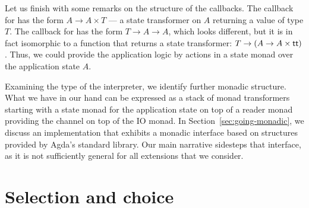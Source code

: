 \documentclass[acmsmall,review,anonymous,screen]{acmart}
\begin{document}
Let us finish with some remarks on the structure of the callbacks. The
callback for {\ACSEND} has the form $A \to A \times T$ --- a state
transformer on $A$ returning a value of type $T$. The callback for
{\ACRECV} has the form $T \to A \to A$, which looks different, but it
is in fact isomorphic to a function that returns a state transformer:
$T \to (A \to A \times \Att)$. Thus, we could provide the
application logic by actions in a state monad over the application
state $A$.

Examining the type of the interpreter, we identify further monadic
structure. What we have in our hand can be expressed as a stack of monad transformers starting with a state
monad for the application state on top of a reader monad providing the
channel on top of the IO monad. In Section~\ref{sec:going-monadic},
we discuss an implementation that exhibits a monadic interface based
on structures provided by Agda's standard library.
Our main narrative sidesteps that interface, as it is not sufficiently
general for all extensions that we consider.

\section{Selection and choice}
\label{sec:select-choice}
\end{document}
